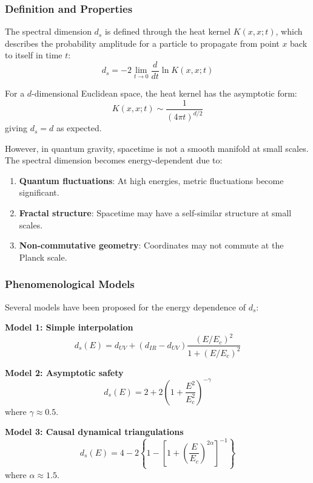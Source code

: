 \documentclass[12pt,a4paper]{article}
\begin{document}
\subsubsection{Definition and Properties}

The spectral dimension $d_s$ is defined through the heat kernel $K(x,x;t)$, which describes the probability amplitude for a particle to propagate from point $x$ back to itself in time $t$:
\begin{equation}
    d_s = -2 \lim_{t \to 0} \frac{d}{dt} \ln K(x,x;t)
\end{equation}

For a $d$-dimensional Euclidean space, the heat kernel has the asymptotic form:
\begin{equation}
    K(x,x;t) \sim \frac{1}{(4\pi t)^{d/2}}
\end{equation}
giving $d_s = d$ as expected.

However, in quantum gravity, spacetime is not a smooth manifold at small scales. The spectral dimension becomes energy-dependent due to:
\begin{enumerate}
    \item \textbf{Quantum fluctuations}: At high energies, metric fluctuations become significant.
    \item \textbf{Fractal structure}: Spacetime may have a self-similar structure at small scales.
    \item \textbf{Non-commutative geometry}: Coordinates may not commute at the Planck scale.
\end{enumerate}

\subsubsection{Phenomenological Models}

Several models have been proposed for the energy dependence of $d_s$:

\textbf{Model 1: Simple interpolation}
\begin{equation}
    d_s(E) = d_{UV} + (d_{IR} - d_{UV}) \frac{(E/E_c)^2}{1+(E/E_c)^2}
\end{equation}

\textbf{Model 2: Asymptotic safety}
\begin{equation}
    d_s(E) = 2 + 2\left(1 + \frac{E^2}{E_c^2}\right)^{-\gamma}
\end{equation}
where $\gamma \approx 0.5$.

\textbf{Model 3: Causal dynamical triangulations}
\begin{equation}
    d_s(E) = 4 - 2\left\{1 - \left[1 + \left(\frac{E}{E_c}\right)^{2\alpha}\right]^{-1}\right\}
\end{equation}
where $\alpha \approx 1.5$.
\end{document}

